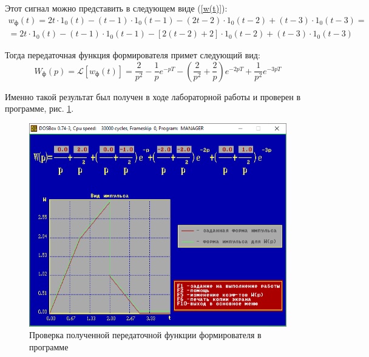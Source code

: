 	\begin{center}
		\label{w}
	\end{center}
	
	
	Этот сигнал можно представить в следующем виде (\ref{w(t)}):
	\begin{multline}
		w_\text{ф}(t) = 2t\cdot 1_0 (t) - (t-1)\cdot 1_0 (t-1) - (2t-2)\cdot 1_0 (t-2) + (t-3)\cdot 1_0 (t-3) = \\ = 2t\cdot 1_0 (t) - (t-1)\cdot 1_0 (t-1) - [2(t-2)+2]\cdot 1_0 (t-2) + (t-3)\cdot 1_0 (t-3)
		\label{w(t)}
	\end{multline}
	
	Тогда передаточная функция формирователя примет следующий вид:
	\begin{equation}
		W_\text{ф}(p) = \mathcal{L}[w_\text{ф}(t)] = \frac{2}{p^2} - \frac{1}{p} e^{-pT} - \left(\frac{2}{p^2} + \frac{2}{p}\right)e^{-2pT} + \frac{1}{p^2}e^{-3pT}
		\label{Wf}
	\end{equation}
	
	Именно такой результат был получен в ходе лабораторной работы и проверен в программе, рис. \ref{Wf_screenshot}.
	
	\begin{figure}
		\centering\includegraphics[width=.6\textwidth]{png/wf.png}
		\caption{Проверка полученной передаточной функции формирователя в программе}
		\label{Wf_screenshot}
	\end{figure}
	
